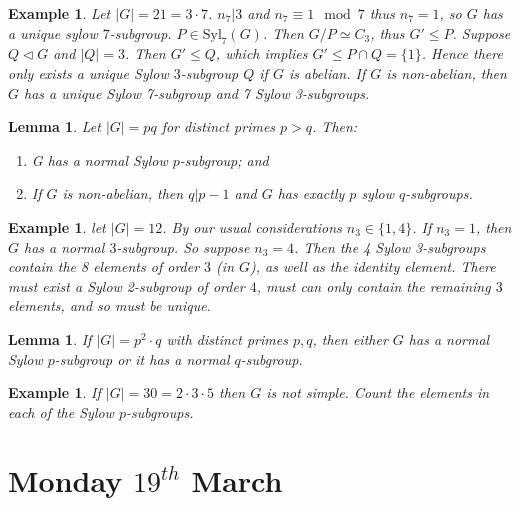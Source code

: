 \documentclass[a4paper,10pt]{article}
\newtheorem{eg}[thm]{Example}
\newtheorem{Lem}[thm]{Lemma}
\begin{document}
\begin{eg}
Let $|G| = 21 = 3 \cdot 7$. $n_7 | 3$ and $n_7 \equiv 1 \mod 7$ thus $n_7 = 1$, so $G$ has a unique sylow $7$-subgroup. $P \in \text{Syl}_7(G)$. Then $G / P \simeq C_3$, thus $G' \leq P$. Suppose $Q \triangleleft G$ and $|Q| = 3$. Then $G' \leq Q$, which implies $G' \leq P \cap Q = \{1\}$. Hence there only exists a unique Sylow $3$-subgroup $Q$ if $G$ is abelian. If $G$ is non-abelian, then $G$ has a unique Sylow 7-subgroup and 7 Sylow 3-subgroups. 
\end{eg}

\begin{Lem}
Let $|G| = pq$ for distinct primes $p > q$. Then:
\begin{enumerate}
\item G has a normal Sylow $p$-subgroup; and
\item If $G$ is non-abelian, then $q | p -1$ and $G$ has exactly $p$ sylow $q$-subgroups.
\end{enumerate}
\end{Lem}

\begin{eg}
let $|G| = 12$. By our usual considerations $n_3 \in \{1,4\}$. If $n_3 = 1$, then $G$ has a normal $3$-subgroup. So suppose $n_3 = 4$. Then the 4 Sylow 3-subgroups contain the 8 elements of order $3$ (in $G$), as well as the identity element. There must exist a Sylow 2-subgroup of order $4$, must can only contain the remaining $3$ elements, and so must be unique. 
\end{eg}

\begin{Lem}
If $|G| = p^2 \cdot q$ with distinct primes $p,q$, then either $G$ has a normal Sylow $p$-subgroup or it has a normal $q$-subgroup.
\end{Lem}

\begin{eg}
If $|G| = 30 = 2 \cdot 3 \cdot 5$ then $G$ is not simple. Count the elements in each of the Sylow $p$-subgroups.
\end{eg}












\newpage
\section{Monday $19^{th}$ March}
\end{document}

